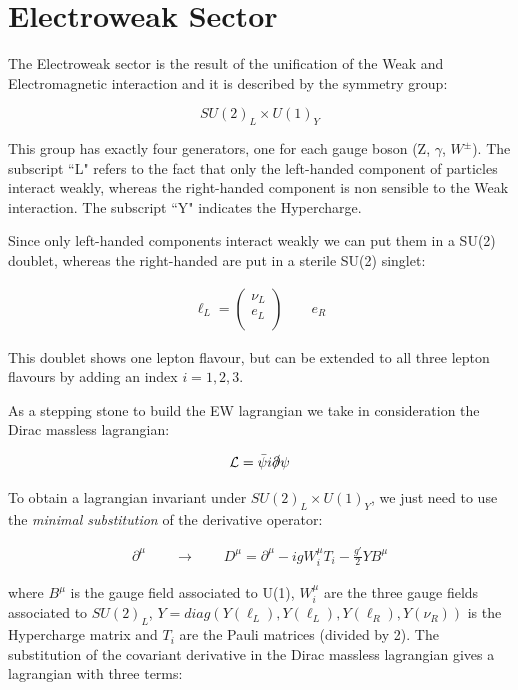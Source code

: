 \section{Electroweak Sector}

The Electroweak sector is the result of the unification of the Weak and Electromagnetic interaction and it 
is described by the symmetry group:

\begin{equation}
    SU(2)_L \times U(1)_Y
\end{equation}

This group has exactly four generators, one for each gauge boson (Z, $\gamma$, $W^{\pm}$).
The subscript “L" refers to the fact that only the left-handed component of particles interact weakly, 
whereas the right-handed component is non sensible to the Weak interaction.
The subscript “Y" indicates the Hypercharge.

Since only left-handed components interact weakly we can put them in a SU(2) doublet, whereas the right-handed
are put in a sterile SU(2) singlet:

\begin{align}
    \ell_L = 
    \begin{pmatrix}
    \nu_L\\
    e_L \\
    \end{pmatrix}
    \qquad
    e_R
\label{eq:lh}
\end{align}

This doublet shows one lepton flavour, but can be extended to all three lepton flavours by 
adding an index $i = 1, 2, 3$.

As a stepping stone to build the EW lagrangian we take in consideration the Dirac massless lagrangian:

\begin{equation}
    \mathcal{L} = \bar{\psi} i \slashed{\partial} \psi
\label{eq:dirac_equation}
\end{equation}

To obtain a lagrangian invariant under $SU(2)_L \times U(1)_Y$, we just need to use the \textit{minimal substitution}
of the derivative operator:

\begin{align}
    \partial^{\mu}
    \qquad
    \rightarrow
    \qquad
    D^{\mu} = \partial^{\mu} - igW^{\mu}_i T_i - \frac{g'}{2}YB^{\mu}
\end{align}

where $B^{\mu}$ is the gauge field associated to U(1), $W_i^{\mu}$ are the three gauge fields associated to $SU(2)_L$,
$Y=diag(Y(\ell_L), Y(\ell_L), Y(\ell_R), Y(\nu_R))$ is the Hypercharge matrix and $T_i$ are the Pauli matrices (divided by 2).
The substitution of the covariant derivative in the Dirac massless lagrangian gives a lagrangian with three terms:

